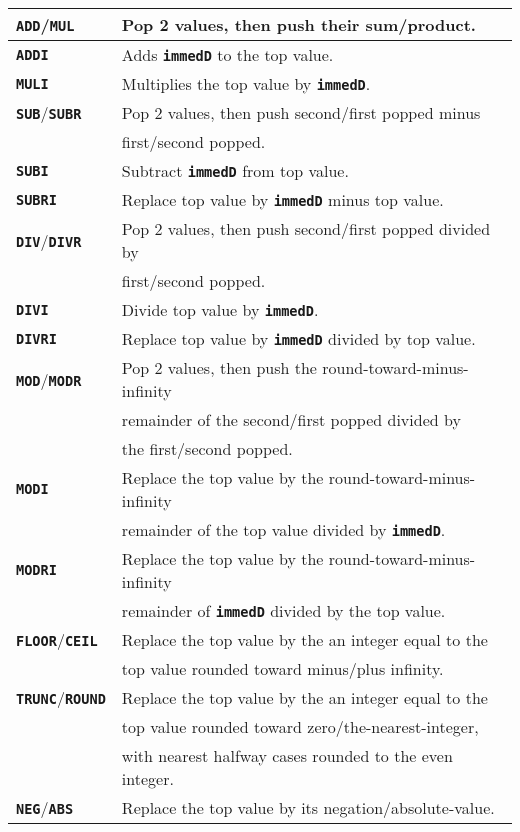 \documentclass[12pt]{article}
\newcommand{\TT}[1]{{\tt \bfseries #1}}
\newlength{\figurewidth}
\newenvironment{boxedfigure}[1][!btp]%
	{\begin{figure*}[#1]
	 \begin{lrbox}{\figurebox}
	 \begin{minipage}{\figurewidth}

	 \vspace*{1ex}}%
	{
	 \vspace*{1ex}

	 \end{minipage}
	 \end{lrbox}

	 \centering
	 \fbox{\hspace*{0.1in}\usebox{\figurebox}\hspace*{0.1in}}
	 \end{figure*}}
\begin{document}
\begin{boxedfigure}
\begin{center}
\begin{tabular}{|l|l|}
\hline
\TT{ADD}/\TT{MUL}
    & Pop 2 values, then push their sum/product.
\\\hline
\TT{ADDI}
    & Adds \TT{immedD} to the top value.
\\\hline
\TT{MULI}
    & Multiplies the top value by \TT{immedD}.
\\\hline
\TT{SUB}/\TT{SUBR}
    & Pop 2 values, then push second/first popped minus \\
    & first/second popped.
\\\hline
\TT{SUBI}
    & Subtract \TT{immedD} from top value.
\\\hline
\TT{SUBRI}
    & Replace top value by \TT{immedD} minus top value.
\\\hline
\TT{DIV}/\TT{DIVR}
    & Pop 2 values, then push second/first popped divided by\\
    & first/second popped.
\\\hline
\TT{DIVI}
    & Divide top value by \TT{immedD}.
\\\hline
\TT{DIVRI}
    & Replace top value by \TT{immedD} divided by top value.
\\\hline
\TT{MOD}/\TT{MODR}
    & Pop 2 values, then push the round-toward-minus-infinity \\
    & remainder of the second/first popped divided by \\
    & the first/second popped.
\\\hline
\TT{MODI}
    & Replace the top value by the round-toward-minus-infinity \\
    & remainder of the top value divided by \TT{immedD}.
\\\hline
\TT{MODRI}
    & Replace the top value by the round-toward-minus-infinity \\
    & remainder of \TT{immedD} divided by the top value.
\\\hline
\TT{FLOOR}/\TT{CEIL}
    & Replace the top value by the an integer equal to the \\
    & top value rounded toward minus/plus infinity.
\\\hline
\TT{TRUNC}/\TT{ROUND}
    & Replace the top value by the an integer equal to the \\
    & top value rounded toward zero/the-nearest-integer, \\
    & with nearest halfway cases rounded to the even integer.
\\\hline
\TT{NEG}/\TT{ABS}
    & Replace the top value by its negation/absolute-value.

\end{tabular}
\end{center}
\end{boxedfigure}
\end{document}
